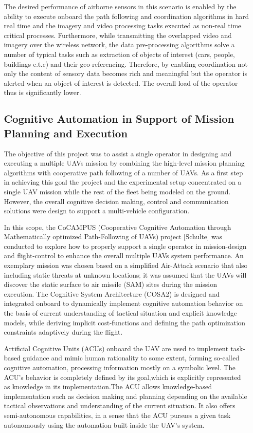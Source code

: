 \documentclass[letterpaper, 10 pt, conference]{ieeeconf}  %
\begin{document}
The desired performance of airborne sensors in this scenario is enabled by the ability to execute onboard the path following and coordination algorithms in hard real time and the imagery and video processing tasks executed as non-real time critical processes. Furthermore, while transmitting the overlapped video and imagery over the wireless network, the data pre-processing algorithms  solve a number of typical tasks such as extraction of objects of interest (cars, people, buildings e.t.c) and their geo-referencing. Therefore, by enabling coordination not only the content of sensory data becomes rich and meaningful but the operator is alerted when an object of interest is detected. The overall load of the operator thus is significantly lower. 

\subsection{Cognitive Automation in Support of Mission Planning and Execution} 

The objective of this project was to assist a single operator in designing and executing a multiple UAVs mission by combining the high-level mission planning algorithms with cooperative path following of a number of UAVs. As a first step in achieving this goal the project and the experimental setup concentrated on a single UAV mission while the rest of the fleet being modeled on the ground. However, the overall cognitive decision making, control and communication solutions were design to support a multi-vehicle configuration. 

In this scope, the CoCAMPUS (Cooperative Cognitive Automation through Mathematically optimized Path-Following of UAVs) project [Schulte] was conducted to explore how to properly support a single operator in mission-design and flight-control to enhance the overall multiple UAVs system performance. An exemplary mission was chosen based on a simplified Air-Attack scenario that also including static threats at unknown locations; it was assumed that the UAVs will discover the static surface to air missile (SAM) sites during the mission execution. The Cognitive System Architecture (COSA2) is designed and integrated onboard  to dynamically implement cognitive automation behavior on the basis of current understanding of tactical situation and explicit knowledge models,  while deriving implicit cost-functions and defining the path optimization constraints adaptively during the flight.

Artificial Cognitive Units (ACUs) onboard the UAV are used to implement task-based guidance and mimic human rationality to some extent, forming so-called cognitive automation, processing information mostly on a symbolic level. The ACU’s behavior is completely defined by its goal,which is explicitly represented as knowledge in its implementation.The ACU allows knowledge-based implementation such as decision making and planning depending on the available tactical observations and understanding of the current situation. It also offers semi-autonomous capabilities, in a sense that the ACU pursues a given task autonomously using the automation built inside the UAV’s system.
\end{document}
